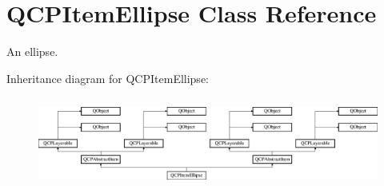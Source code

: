 \hypertarget{class_q_c_p_item_ellipse}{}\section{Q\+C\+P\+Item\+Ellipse Class Reference}
\label{class_q_c_p_item_ellipse}


An ellipse.  


Inheritance diagram for Q\+C\+P\+Item\+Ellipse\+:\begin{figure}[H]
\begin{center}
\leavevmode
\includegraphics[height=3.017241cm]{class_q_c_p_item_ellipse}
\end{center}
\end{figure}
